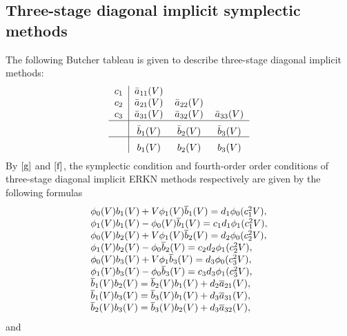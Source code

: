 \documentclass{article}
\begin{document}
\subsection{Three-stage diagonal implicit  symplectic methods}\label{334455}
The following Butcher tableau is given to describe three-stage
diagonal implicit methods:
\[%
\begin{tabular}
[c]{c|ccc}%
$c_{1}$ & $\bar{a}_{11}(V)$ \\
$c_{2}$ & $\bar{a}_{21}(V)$ & $\bar{a}_{22}(V)$ \\
$c_{3}$ & $\bar{a}_{31}(V)$ & $\bar{a}_{32}(V)$ &
$\bar{a}_{33}(V)$\\\hline &
$\raisebox{-1.3ex}[0.5pt]{$\bar{b}_1(V)$}$ &
\raisebox{-1.3ex}{$\bar{b}_2(V)$} &
$\raisebox{-1.3ex}[0.5pt]{$\bar{b}_3(V)$}$\\\hline &
$\raisebox{-1.3ex}[1.0pt]{$b_1(V)$}$ &
$\raisebox{-1.3ex}[1.0pt]{$b_2(V)$}$
& $\raisebox{-1.3ex}[1.0pt]{$b_3(V)$}$%
\end{tabular}
\]
By $\eqref{g}$ and $\eqref{f}$, the symplectic condition and
fourth-order order conditions of three-stage diagonal implicit ERKN
methods respectively are given by the following formulas
\begin{equation}
\begin{array}
[c]{ll}
\phi_{0}(V)b_{1}(V)+V\phi_{1}(V)\overline{b}_{1}(V)=d_{1}\phi_{0}(c_{1}^{2}V),
 \\\phi_{1}(V)b_{1}(V)-\phi_{0}(V)\overline{b}_{1}(V)=c_{1}d_{1}\phi_{1}(c_{1}^{2}V),
 \\\phi_{0}(V)b_{2}(V)+V\phi_{1}(V)\overline{b}_{2}(V)=d_{2}\phi_{0}(c_{2}^{2}V),
 \\\phi_{1}(V)b_{2}(V)-\phi_{0}\overline{b}_{2}(V)=c_{2}d_{2}\phi_{1}(c_{2}^{2}V),
 \\\phi_{0}(V)b_{3}(V)+V\phi_{1}\overline{b}_{3}(V)=d_{3}\phi_{0}(c_{3}^{2}V),
 \\\phi_{1}(V)b_{3}(V)-\phi_{0}\overline{b}_{3}(V)=c_{3}d_{3}\phi_{1}(c_{3}^{2}V),
 \\\overline{b}_{1}(V)b_{2}(V)=\overline{b}_{2}(V)b_{1}(V)+d_{2}\overline{a}_{21}(V),
 \\\overline{b}_{1}(V)b_{3}(V)=\overline{b}_{3}(V)b_{1}(V)+d_{3}\overline{a}_{31}(V),
 \\\overline{b}_{2}(V)b_{3}(V)=\overline{b}_{3}(V)b_{2}(V)+d_{3}\overline{a}_{32}(V),
\end{array}
 \label{erkn123}%
\end{equation}
and
\end{document}
